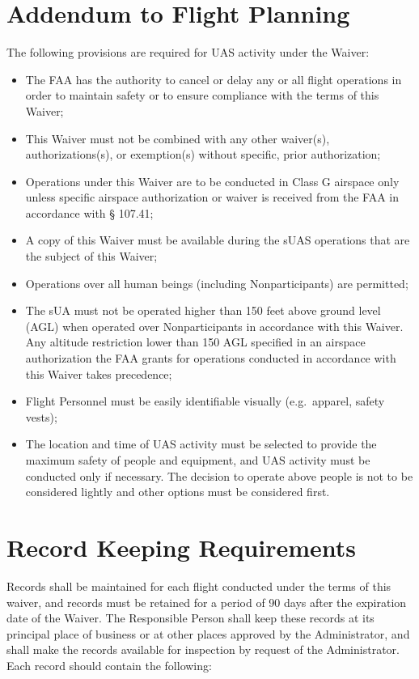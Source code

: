 \documentclass[
]{book}
\providecommand{\tightlist}{%
  \setlength{\itemsep}{0pt}\setlength{\parskip}{0pt}}
\begin{document}
\section{Addendum to Flight Planning}\label{s39v-fp}

The following provisions are required for UAS activity under the Waiver:

\begin{itemize}
\tightlist
\item
  The FAA has the authority to cancel or delay any or all flight operations in order to maintain safety or to ensure compliance with the terms of this Waiver;
\item
  This Waiver must not be combined with any other waiver(s), authorizations(s), or exemption(s) without specific, prior authorization;
\item
  Operations under this Waiver are to be conducted in Class G airspace only unless specific airspace authorization or waiver is received from the FAA in accordance with § 107.41;
\item
  A copy of this Waiver must be available during the sUAS operations that are the subject of this Waiver;
\item
  Operations over all human beings (including Nonparticipants) are permitted;
\item
  The sUA must not be operated higher than 150 feet above ground level (AGL) when operated over Nonparticipants in accordance with this Waiver. Any altitude restriction lower than 150 AGL specified in an airspace authorization the FAA grants for operations conducted in accordance with this Waiver takes precedence;
\item
  Flight Personnel must be easily identifiable visually (e.g.~apparel, safety vests);
\item
  The location and time of UAS activity must be selected to provide the maximum safety of people and equipment, and UAS activity must be conducted only if necessary. The decision to operate above people is not to be considered lightly and other options must be considered first.
\end{itemize}

\section{Record Keeping Requirements}\label{s39v-rk}

Records shall be maintained for each flight conducted under the terms of this waiver, and records must be retained for a period of 90 days after the expiration date of the Waiver. The Responsible Person shall keep these records at its principal place of business or at other places approved by the Administrator, and shall make the records available for inspection by request of the Administrator. Each record should contain the following:
\end{document}
